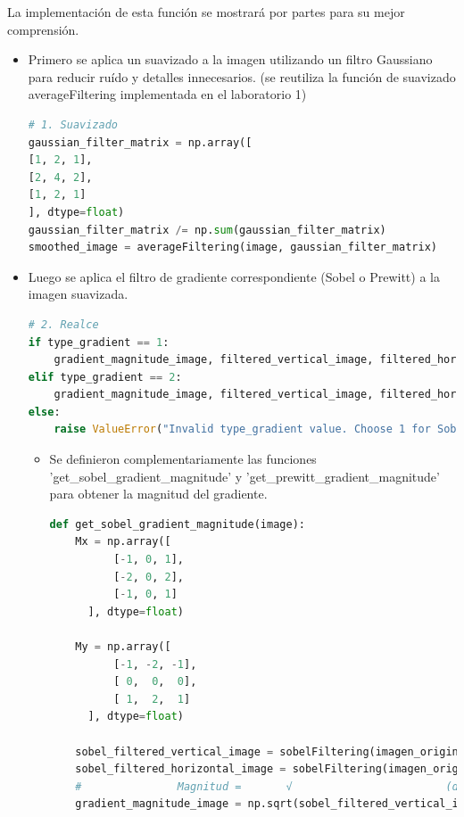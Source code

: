 \documentclass{article}
\begin{document}
    La implementación de esta función se mostrará por partes para su mejor comprensión.
    \begin{itemize}
        \item
        Primero se aplica un suavizado a la imagen utilizando un filtro Gaussiano para reducir ruído y detalles innecesarios.
        (se reutiliza la función de suavizado averageFiltering implementada en el laboratorio 1)
        \begin{lstlisting}[language=Python, caption={Implementación edgeDetector - Suavisado},label={lst:edgeDetector1}]
# 1. Suavizado
gaussian_filter_matrix = np.array([
[1, 2, 1],
[2, 4, 2],
[1, 2, 1]
], dtype=float)
gaussian_filter_matrix /= np.sum(gaussian_filter_matrix)
smoothed_image = averageFiltering(image, gaussian_filter_matrix)
        \end{lstlisting}
        \item
        Luego se aplica el filtro de gradiente correspondiente (Sobel o Prewitt) a la imagen suavizada.
        \begin{lstlisting}[language=Python, caption={Implementación edgeDetector - Gradiente},label={lst:edgeDetector2}]
# 2. Realce
if type_gradient == 1:
    gradient_magnitude_image, filtered_vertical_image, filtered_horizontal_image = get_sobel_gradient_magnitude(smoothed_image)
elif type_gradient == 2:
    gradient_magnitude_image, filtered_vertical_image, filtered_horizontal_image = get_prewitt_gradient_magnitude(smoothed_image)
else:
    raise ValueError("Invalid type_gradient value. Choose 1 for Sobel or 2 for Prewitt.")
        \end{lstlisting}
        \begin{itemize}
            \item Se definieron complementariamente las funciones 'get\_sobel\_gradient\_magnitude' y
            \newline 'get\_prewitt\_gradient\_magnitude' para obtener la magnitud del gradiente.
            \begin{lstlisting}[language=Python, caption={Implementación get\_sobel\_gradient\_magnitude},label={lst:getSobelGradientMagnitude}]
def get_sobel_gradient_magnitude(image):
    Mx = np.array([
          [-1, 0, 1],
          [-2, 0, 2],
          [-1, 0, 1]
      ], dtype=float)

    My = np.array([
          [-1, -2, -1],
          [ 0,  0,  0],
          [ 1,  2,  1]
      ], dtype=float)

    sobel_filtered_vertical_image = sobelFiltering(imagen_original, Mx)
    sobel_filtered_horizontal_image = sobelFiltering(imagen_original, My)
    #               Magnitud =       √                        (df/dx)^2 + (df/dy)^2
    gradient_magnitude_image = np.sqrt(sobel_filtered_vertical_image**2 + sobel_filtered_horizontal_image**2)


\end{lstlisting}
\end{itemize}
\end{itemize}
\end{document}
